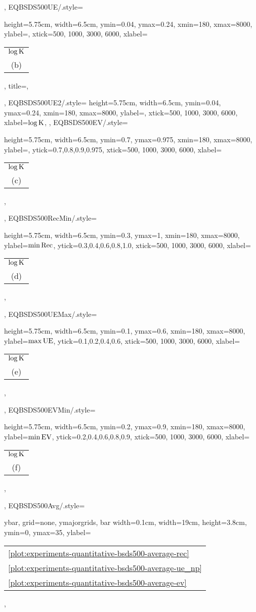 {{    },
    EQBSDS500UE/.style={
        height=5.75cm,
        width=6.5cm,
        ymin=0.04,
        ymax=0.24,
        xmin=180,
        xmax=8000,
        ylabel=\UE,
        xtick={500, 1000, 3000, 6000},
        xlabel=\begin{tabular}{c}$\log\text{K}$\\(b)\end{tabular},
        title=\BSDS,
    },
    EQBSDS500UE2/.style={
        height=5.75cm,
        width=6.5cm,
        ymin=0.04,
        ymax=0.24,
        xmin=180,
        xmax=8000,
        ylabel=\UE,
        xtick={500, 1000, 3000, 6000},
        xlabel=$\log\text{K}$,
    },
    EQBSDS500EV/.style={
        height=5.75cm,
        width=6.5cm,
        ymin=0.7,
        ymax=0.975,
        xmin=180,
        xmax=8000,
        ylabel=\EV,
        ytick={0.7,0.8,0.9,0.975},
        xtick={500, 1000, 3000, 6000},
        xlabel=\begin{tabular}{c}$\log\text{K}$\\(c)\end{tabular},
    },
    EQBSDS500RecMin/.style={
        height=5.75cm,
        width=6.5cm,
        ymin=0.3,
        ymax=1,
        xmin=180,
        xmax=8000,
        ylabel=$\min\text{Rec}$,
        ytick={0.3,0.4,0.6,0.8,1.0},
        xtick={500, 1000, 3000, 6000},
        xlabel=\begin{tabular}{c}$\log\text{K}$\\(d)\end{tabular},
    },
    EQBSDS500UEMax/.style={
        height=5.75cm,
        width=6.5cm,
        ymin=0.1,
        ymax=0.6,
        xmin=180,
        xmax=8000,
        ylabel=$\max\text{UE}$,
        ytick={0.1,0.2,0.4,0.6},
        xtick={500, 1000, 3000, 6000},
        xlabel=\begin{tabular}{c}$\log\text{K}$\\(e)\end{tabular},
    },
    EQBSDS500EVMin/.style={
        height=5.75cm,
        width=6.5cm,
        ymin=0.2,
        ymax=0.9,
        xmin=180,
        xmax=8000,
        ylabel=$\min\text{EV}$,
        ytick={0.2,0.4,0.6,0.8,0.9},
        xtick={500, 1000, 3000, 6000},
        xlabel=\begin{tabular}{c}$\log\text{K}$\\(f)\end{tabular},
    },
    EQBSDS500Avg/.style={
    	ybar,
    	grid=none,
    	ymajorgrids,
		bar width=0.1cm,
		width=19cm,
		height=3.8cm,
		ymin=0,
		ymax=35,
		ylabel=\begin{tabular}{l}\ref{plot:experiments-quantitative-bsds500-average-rec} \ARec\\\ref{plot:experiments-quantitative-bsds500-average-ue_np} \AUE\\\ref{plot:experiments-quantitative-bsds500-average-ev} \AEV\end{tabular},
}}

